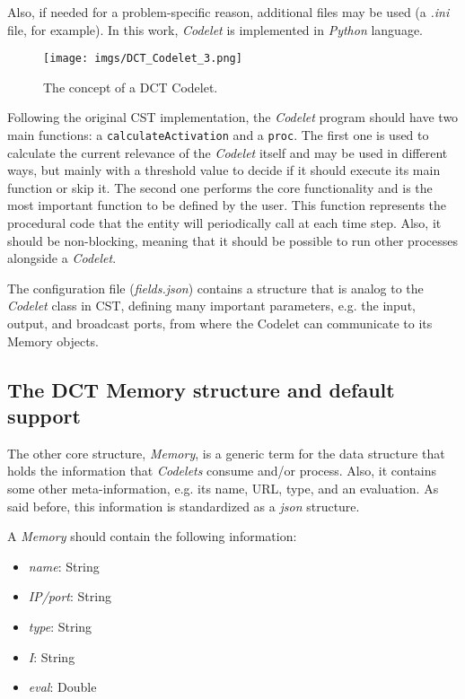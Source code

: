 Also, if needed for a problem-specific reason, additional files may be used (a \emph{.ini} file, for example). In this work, \emph{Codelet} is implemented in \emph{Python} language.


\begin{figure}[bt]
\centering
	\texttt{[image: imgs/DCT\_Codelet\_3.png]}
\caption{The concept of a DCT Codelet.}
\label{fig:Codelet}
\end{figure}

Following the original CST implementation, the \emph{Codelet} program should have two main functions: a  \verb!calculateActivation! and a \verb!proc!. The first one is used to calculate the current relevance of the \emph{Codelet} itself and may be used in different ways, but mainly with a threshold value to decide if it should execute its main function or skip it. The second one performs the core functionality and is the most important function to be defined by the user. This function represents the procedural code that the entity will periodically call at each time step. Also, it should be non-blocking, meaning that it should be possible to run other processes alongside a \emph{Codelet}.

The configuration file (\emph{fields.json}) contains a structure that is analog to the \emph{Codelet} class in CST, defining many important parameters, e.g. the input, output, and broadcast ports, from where the Codelet can communicate to its Memory objects. 


\subsection{The DCT Memory structure and default support}
\label{sec:dct_memory}

The other core structure, \emph{Memory}, is a generic term for the data structure that holds the information that \emph{Codelets} consume and/or process. Also, it contains some other meta-information, e.g. its name, URL, type, and an evaluation. As said before, this information is standardized as a \emph{json} structure. 

A \emph{Memory} should contain the following information:
 \begin{itemize}
     \item \emph{name}: String 
     \item \emph{IP/port}: String
     \item \emph{type}: String
     \item \emph{I}: String
     \item \emph{eval}: Double 
 \end{itemize}

